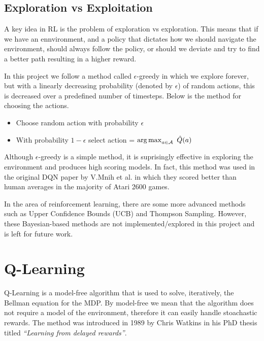 \subsection{Exploration vs Exploitation}
\label{dsgn:sec:rl:expt-v-explor}
A key idea in RL is the problem of exploration vs exploration. This means that if we have an ennvironment, and a policy that dictates how we should navigate the environment, should always follow the policy, or should we deviate and try to find a better path resulting in a higher reward.

In this project we follow a method called $\epsilon$-greedy in which we explore forever, but with a linearly decreasing probability (denoted by $\epsilon$) of random actions, this is decreased over a predefined number of timesteps. Below is the method for choosing the actions.

\begin{center}
	\begin{itemize}
		\item Choose random action with probability $\epsilon$
		\item With probability $1 - \epsilon$ select action = $\operatorname*{arg\,max}_{a \in \mathcal{A}}~\hat{Q}(a)$
	\end{itemize}
\end{center}

Although $\epsilon$-greedy is a simple method, it is suprisingly effective in exploring the environment and produces high scoring models. In fact, this method was used in the original DQN paper by V.Mnih et al. in which they scored better than human averages in the majority of Atari 2600 games.

In the area of reinforcement learning, there are some more advanced methods such as Upper Confidence Bounds (UCB) and Thompson Sampling. However, these Bayesian-based methods are not implemented/explored in this project and is left for future work.

\newpage

\section{Q-Learning}
\label{dsgn:sec:qlearning}
Q-Learning is a model-free algorithm that is used to solve, iteratively, the Bellman equation for the MDP. By model-free we mean that the algorithm does not require a model of the environment, therefore it can easily handle stoachastic rewards. The method was introduced in 1989 by Chris Watkins in his PhD thesis titled \textit{``Learning from delayed rewards''}.

